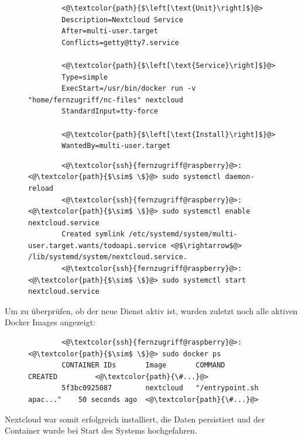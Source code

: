 \documentclass[a4paper, 11pt]{scrartcl}
\begin{document}
\begin{figure}[H]
    \begin{mdframed}[backgroundcolor=bbg]
        \begin{lstlisting}
        <@\textcolor{path}{$\left[\text{Unit}\right]$}@>
        Description=Nextcloud Service
        After=multi-user.target
        Conflicts=getty@tty7.service

        <@\textcolor{path}{$\left[\text{Service}\right]$}@>
        Type=simple
        ExecStart=/usr/bin/docker run -v "home/fernzugriff/nc-files" nextcloud
        StandardInput=tty-force

        <@\textcolor{path}{$\left[\text{Install}\right]$}@>
        WantedBy=multi-user.target
        \end{lstlisting}
    \end{mdframed}
    \label{lst:service_file}
\end{figure}

\begin{figure}[H]
    \begin{mdframed}[backgroundcolor=bbg]
        \begin{lstlisting}
        <@\textcolor{ssh}{fernzugriff@raspberry}@>:<@\textcolor{path}{$\sim$ \$}@> sudo systemctl daemon-reload
        <@\textcolor{ssh}{fernzugriff@raspberry}@>:<@\textcolor{path}{$\sim$ \$}@> sudo systemctl enable nextcloud.service
        Created symlink /etc/systemd/system/multi-user.target.wants/todoapi.service <@$\rightarrow$@> /lib/systemd/system/nextcloud.service.
        <@\textcolor{ssh}{fernzugriff@raspberry}@>:<@\textcolor{path}{$\sim$ \$}@> sudo systemctl start nextcloud.service
        \end{lstlisting}
    \end{mdframed}
    \label{lst:enable_service}
\end{figure}
Um zu überprüfen, ob der neue Dienst aktiv ist, wurden zuletzt noch alle aktiven Docker Images angezeigt:
\begin{figure}[H]
    \begin{mdframed}[backgroundcolor=bbg]
        \begin{lstlisting}
        <@\textcolor{ssh}{fernzugriff@raspberry}@>:<@\textcolor{path}{$\sim$ \$}@> sudo docker ps
        CONTAINER IDs       Image       COMMAND                     CREATED         <@\textcolor{path}{\#...}@>
        5f3bc0925087        nextcloud   "/entrypoint.sh apac..."    50 seconds ago  <@\textcolor{path}{\#...}@>
        \end{lstlisting}
    \end{mdframed}
    \label{lst:enable_service}
\end{figure}
Nextcloud war somit erfolgreich installiert, die Daten persistiert und der Container wurde bei Start des Systems hochgefahren.
\end{document}
